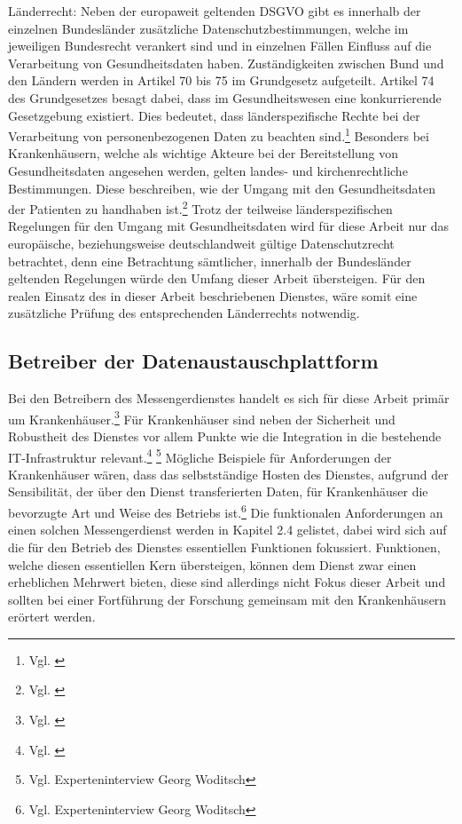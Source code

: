 Länderrecht: Neben der europaweit geltenden DSGVO gibt es innerhalb der einzelnen Bundesländer zusätzliche Datenschutzbestimmungen, welche im jeweiligen Bundesrecht verankert sind und in einzelnen Fällen Einfluss auf die Verarbeitung von Gesundheitsdaten haben.
Zuständigkeiten zwischen Bund und den Ländern werden in Artikel 70 bis 75 im Grundgesetz aufgeteilt. Artikel 74 des Grundgesetzes besagt dabei, dass im Gesundheitswesen eine konkurrierende Gesetzgebung existiert. Dies bedeutet, dass länderspezifische Rechte bei der Verarbeitung von personenbezogenen Daten zu beachten sind.\footnote{Vgl. \cite[S. 8 f.]{Bundesverband-Gesundheits-IT-e.V.2016}} Besonders bei Krankenhäusern, welche als wichtige Akteure bei der Bereitstellung von Gesundheitsdaten angesehen werden, gelten landes- und kirchenrechtliche Bestimmungen. Diese beschreiben, wie der Umgang mit den Gesundheitsdaten der Patienten zu handhaben ist.\footnote{Vgl. \cite[S. 21]{Bundesaerztekammer2020}}
Trotz der teilweise länderspezifischen Regelungen für den Umgang mit Gesundheitsdaten wird für diese Arbeit nur das europäische, beziehungsweise deutschlandweit gültige Datenschutzrecht betrachtet, denn eine Betrachtung sämtlicher, innerhalb der Bundesländer geltenden Regelungen würde den Umfang dieser Arbeit übersteigen. Für den realen Einsatz des in dieser Arbeit beschriebenen Dienstes, wäre somit eine zusätzliche Prüfung des entsprechenden Länderrechts notwendig.

\subsection{Betreiber der Datenaustauschplattform}\label{subsection:bdd}
Bei den Betreibern des Messengerdienstes handelt es sich für diese Arbeit primär um Krankenhäuser.\footnote{Vgl. \cite[S. 13]{Bundesverband-Gesundheits-IT-e.V.2016}} Für Krankenhäuser sind neben der Sicherheit und Robustheit des Dienstes vor allem Punkte wie die Integration in die bestehende IT-Infrastruktur relevant.\footnote{Vgl. \cite[S. 110 ff.]{Camphausen2019}} \footnote{Vgl. Experteninterview Georg Woditsch}
Mögliche Beispiele für Anforderungen der Krankenhäuser wären, dass das selbstständige Hosten des Dienstes, aufgrund der Sensibilität, der über den Dienst transferierten Daten, für Krankenhäuser die bevorzugte Art und Weise des Betriebs ist.\footnote{Vgl. Experteninterview Georg Woditsch} Die funktionalen Anforderungen an einen solchen Messengerdienst werden in Kapitel 2.4 gelistet, dabei wird sich auf die für den Betrieb des Dienstes essentiellen Funktionen fokussiert. Funktionen, welche diesen essentiellen Kern übersteigen, können dem Dienst zwar einen erheblichen Mehrwert bieten, diese sind allerdings nicht Fokus dieser Arbeit und sollten bei einer Fortführung der Forschung gemeinsam mit den Krankenhäusern erörtert werden.

